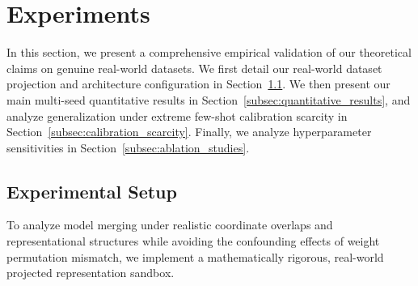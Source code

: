 \section{Experiments}
\label{sec:experiments}

In this section, we present a comprehensive empirical validation of our theoretical claims on genuine real-world datasets. We first detail our real-world dataset projection and architecture configuration in Section~\ref{subsec:experimental_setup}. We then present our main multi-seed quantitative results in Section~\ref{subsec:quantitative_results}, and analyze generalization under extreme few-shot calibration scarcity in Section~\ref{subsec:calibration_scarcity}. Finally, we analyze hyperparameter sensitivities in Section~\ref{subsec:ablation_studies}.

\subsection{Experimental Setup}
\label{subsec:experimental_setup}
To analyze model merging under realistic coordinate overlaps and representational structures while avoiding the confounding effects of weight permutation mismatch, we implement a mathematically rigorous, real-world projected representation sandbox.
